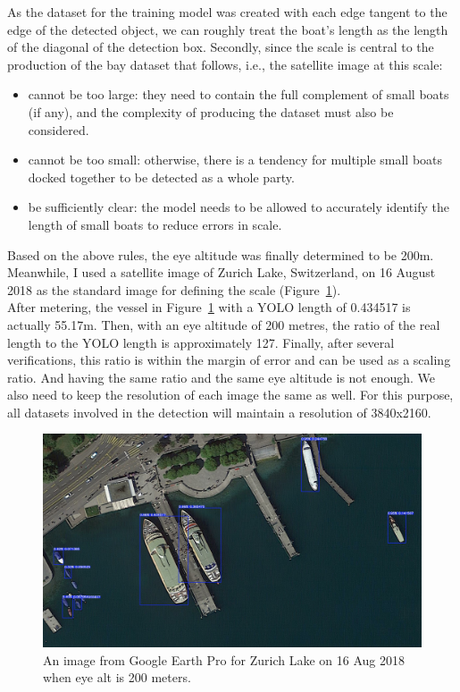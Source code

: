 As the dataset for the training model was created with each edge tangent to the edge of the detected object, we can roughly treat the boat's length as the length of the diagonal of the detection box. Secondly, since the scale is central to the production of the bay dataset that follows, i.e., the satellite image at this scale:
\begin{itemize}
    \item cannot be too large: they need to contain the full complement of small boats (if any), and the complexity of producing the dataset must also be considered.
    \item cannot be too small: otherwise, there is a tendency for multiple small boats docked together to be detected as a whole party.
    \item be sufficiently clear: the model needs to be allowed to accurately identify the length of small boats to reduce errors in scale.
\end{itemize}

Based on the above rules, the eye altitude was finally determined to be 200m. Meanwhile, I used a satellite image of Zurich Lake, Switzerland, on 16 August 2018 as the standard image for defining the scale (Figure~\ref{fig:zurich}). \\

After metering, the vessel in Figure~\ref{fig:zurich} with a YOLO length of 0.434517 is actually 55.17m. Then, with an eye altitude of 200 metres, the ratio of the real length to the YOLO length is approximately 127. Finally, after several verifications, this ratio is within the margin of error and can be used as a scaling ratio. And having the same ratio and the same eye altitude is not enough. We also need to keep the resolution of each image the same as well. For this purpose, all datasets involved in the detection will maintain a resolution of 3840x2160.\\

\begin{figure}
    \centering
    \includegraphics[scale=0.1]{img/zurich.jpg}
    \caption{An image from Google Earth Pro for Zurich Lake on 16 Aug 2018 when eye alt is 200 meters.}
    \label{fig:zurich}
\end{figure}


